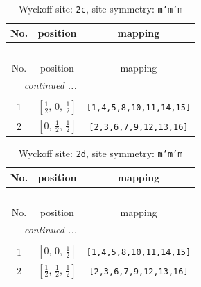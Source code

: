\documentclass[fleqn,8pt]{jsarticle}
\begin{document}
\renewcommand{\arraystretch}{1.2}
\begin{longtable}{ccc}
\caption{Wyckoff site: {\tt 2c}, site symmetry: {\tt m'm'm}}
 \\
 \hline \hline
No. & position & mapping \\ \hline \endfirsthead

\multicolumn{2}{l}{\tablename\ \thetable{}} \\
 \hline \hline
No. & position & mapping \\ \hline \endhead

 \hline \hline
\multicolumn{2}{r}{\footnotesize\it continued ...} \\ \endfoot

 \hline \hline
\multicolumn{2}{r}{} \\ \endlastfoot

1 & $\left[ \frac{1}{2},\, 0,\, \frac{1}{2} \right]$ & {\tt [1,4,5,8,10,11,14,15]} \\ \hline
2 & $\left[ 0,\, \frac{1}{2},\, \frac{1}{2} \right]$ & {\tt [2,3,6,7,9,12,13,16]} \\
\end{longtable}
\renewcommand{\arraystretch}{1.2}
\begin{longtable}{ccc}
\caption{Wyckoff site: {\tt 2d}, site symmetry: {\tt m'm'm}}
 \\
 \hline \hline
No. & position & mapping \\ \hline \endfirsthead

\multicolumn{2}{l}{\tablename\ \thetable{}} \\
 \hline \hline
No. & position & mapping \\ \hline \endhead

 \hline \hline
\multicolumn{2}{r}{\footnotesize\it continued ...} \\ \endfoot

 \hline \hline
\multicolumn{2}{r}{} \\ \endlastfoot

1 & $\left[ 0,\, 0,\, \frac{1}{2} \right]$ & {\tt [1,4,5,8,10,11,14,15]} \\ \hline
2 & $\left[ \frac{1}{2},\, \frac{1}{2},\, \frac{1}{2} \right]$ & {\tt [2,3,6,7,9,12,13,16]} \\
\end{longtable}
\renewcommand{\arraystretch}{1.2}
\end{document}
